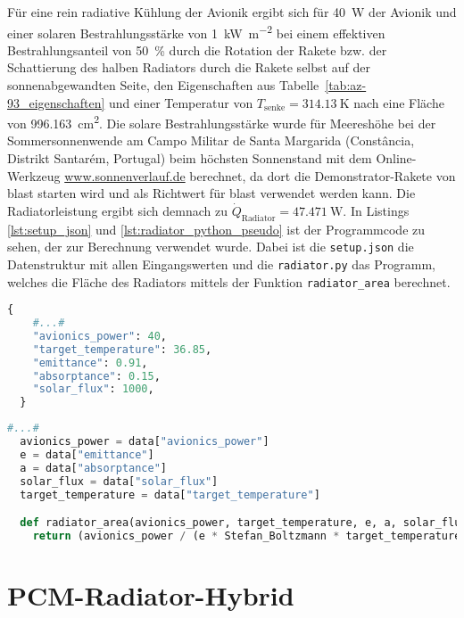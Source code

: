 Für eine rein radiative Kühlung der Avionik ergibt sich für \SI{40}{\watt} der Avionik und einer solaren Bestrahlungsstärke von \SI{1}{\kilo\watt\per\meter\squared}
bei einem effektiven Bestrahlungsanteil von \SI{50}{\percent} durch die Rotation der Rakete bzw. der Schattierung des halben Radiators durch die Rakete selbst auf der sonnenabgewandten Seite, den Eigenschaften aus
Tabelle~\ref{tab:az-93_eigenschaften} und einer Temperatur von $T_\mathrm{senke} = \SI{314,13}{\kelvin}$
nach eine Fläche von \SI{996,163}{\centi\meter\squared}.
Die solare Bestrahlungsstärke wurde für Meereshöhe bei der Sommersonnenwende am Campo Militar de Santa Margarida (Constância, Distrikt Santarém, Portugal) beim höchsten Sonnenstand
mit dem Online-Werkzeug \url{www.sonnenverlauf.de} berechnet, da dort die Demonstrator-Rakete von \ac{blast} starten wird und als Richtwert für \ac{blast} verwendet werden kann.
Die Radiatorleistung ergibt sich demnach zu $\dot{Q}_\mathrm{Radiator} = \SI{47,471}{\watt}$.
In Listings \ref{lst:setup_json} und \ref{lst:radiator_python_pseudo} ist der Programmcode zu sehen, der zur Berechnung verwendet wurde. Dabei ist die \texttt{setup.json} die Datenstruktur mit allen Eingangswerten
und die \texttt{radiator.py} das Programm, welches die Fläche des Radiators mittels der Funktion \texttt{radiator\_area} berechnet.

\begin{lstlisting}[float, language=python, caption={Setup-Werte aus der setup.json.}, label={lst:setup_json}]
  {
    #...#
    "avionics_power": 40,
    "target_temperature": 36.85,
    "emittance": 0.91,
    "absorptance": 0.15,
    "solar_flux": 1000,
  }
\end{lstlisting}

\begin{lstlisting}[float, language=Python, caption={Berechnung der Radiatorfläche in der radiator.py.}, label={lst:radiator_python_pseudo}]
  #...#
  avionics_power = data["avionics_power"]
  e = data["emittance"]
  a = data["absorptance"]
  solar_flux = data["solar_flux"]
  target_temperature = data["target_temperature"]

  def radiator_area(avionics_power, target_temperature, e, a, solar_flux): # radiator area
    return (avionics_power / (e * Stefan_Boltzmann * target_temperature**4 - 0.5 * solar_flux * a))
\end{lstlisting}

\section{PCM-Radiator-Hybrid}\label{sec:pcm_radiator_hybrid}

